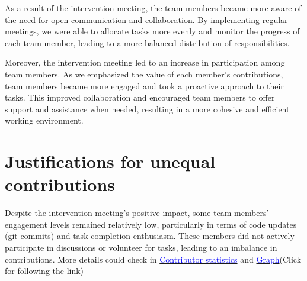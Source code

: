 \documentclass[a4paper]{article}
\begin{document}
As a result of the intervention meeting, the team members became more aware of the need for open communication and collaboration. By implementing regular meetings, we were able to allocate tasks more evenly and monitor the progress of each team member, leading to a more balanced distribution of responsibilities.

Moreover, the intervention meeting led to an increase in participation among team members. As we emphasized the value of each member's contributions, team members became more engaged and took a proactive approach to their tasks. This improved collaboration and encouraged team members to offer support and assistance when needed, resulting in a more cohesive and efficient working environment.

\section*{Justifications for unequal contributions}

Despite the intervention meeting's positive impact, some team members' engagement levels remained relatively low, particularly in terms of code updates (git commits) and task completion enthusiasm. These members did not actively participate in discussions or volunteer for tasks, leading to an imbalance in contributions. More details could check in \href{https://git.cs.bham.ac.uk/team-projects-2022-23/team23-22/-/graphs/main?ref_type=heads}{\textcolor{blue}{Contributor statistics}} and \href{https://git.cs.bham.ac.uk/team-projects-2022-23/team23-22/-/network/main?ref_type=heads}{\textcolor{blue}{Graph}}(Click for following the link)
\end{document}
